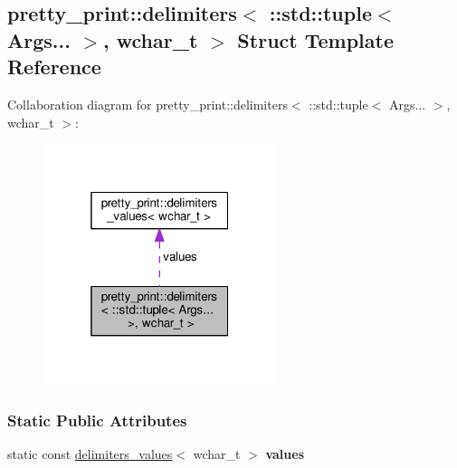 \hypertarget{structpretty__print_1_1delimiters_3_01_1_1std_1_1tuple_3_01Args_8_8_8_01_4_00_01wchar__t_01_4}{}\subsection{pretty\+\_\+print\+:\+:delimiters$<$ \+:\+:std\+:\+:tuple$<$ Args... $>$, wchar\+\_\+t $>$ Struct Template Reference}
\label{structpretty__print_1_1delimiters_3_01_1_1std_1_1tuple_3_01Args_8_8_8_01_4_00_01wchar__t_01_4}


Collaboration diagram for pretty\+\_\+print\+:\+:delimiters$<$ \+:\+:std\+:\+:tuple$<$ Args... $>$, wchar\+\_\+t $>$\+:\nopagebreak
\begin{figure}[H]
\begin{center}
\leavevmode
\includegraphics[width=193pt]{structpretty__print_1_1delimiters_3_01_1_1std_1_1tuple_3_01Args_8_8_8_01_4_00_01wchar__t_01_4__coll__graph}
\end{center}
\end{figure}
\subsubsection*{Static Public Attributes}
\begin{DoxyCompactItemize}
\item 
static const \hyperlink{structpretty__print_1_1delimiters__values}{delimiters\+\_\+values}$<$ wchar\+\_\+t $>$ {\bfseries values}\hypertarget{structpretty__print_1_1delimiters_3_01_1_1std_1_1tuple_3_01Args_8_8_8_01_4_00_01wchar__t_01_4_a7171e728d3ebdf9145b87bfcf716d884}{}\label{structpretty__print_1_1delimiters_3_01_1_1std_1_1tuple_3_01Args_8_8_8_01_4_00_01wchar__t_01_4_a7171e728d3ebdf9145b87bfcf716d884}

\end{DoxyCompactItemize}


